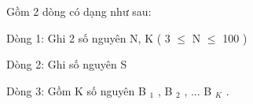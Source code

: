 Gồm 2 dòng có dạng như sau:  

   Dòng 1: Ghi 2 số nguyên N, K ( 3  $\le$  N  $\le$  100 )  

   Dòng 2: Ghi số nguyên S  

   Dòng 3: Gồm K số nguyên B   $_    1   $   , B   $_    2   $   , ... B   $_    K   $   .  

\